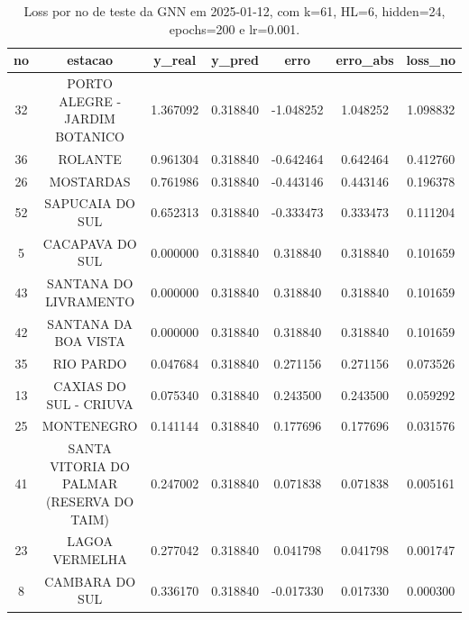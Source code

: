 \begin{table}[h]
\centering
\caption{Loss por no de teste da GNN em 2025-01-12, com k=61, HL=6, hidden=24, epochs=200 e lr=0.001.}
\label{tab:gnn_loss_k61_hl6_h24_e200_d20250112}
\begin{tabular}{ccccccc}
\toprule
no & estacao & y\_real & y\_pred & erro & erro\_abs & loss\_no \\
\midrule
32 & PORTO ALEGRE - JARDIM BOTANICO & 1.367092 & 0.318840 & -1.048252 & 1.048252 & 1.098832 \\
36 & ROLANTE & 0.961304 & 0.318840 & -0.642464 & 0.642464 & 0.412760 \\
26 & MOSTARDAS & 0.761986 & 0.318840 & -0.443146 & 0.443146 & 0.196378 \\
52 & SAPUCAIA DO SUL & 0.652313 & 0.318840 & -0.333473 & 0.333473 & 0.111204 \\
5 & CACAPAVA DO SUL & 0.000000 & 0.318840 & 0.318840 & 0.318840 & 0.101659 \\
43 & SANTANA DO LIVRAMENTO & 0.000000 & 0.318840 & 0.318840 & 0.318840 & 0.101659 \\
42 & SANTANA DA BOA VISTA & 0.000000 & 0.318840 & 0.318840 & 0.318840 & 0.101659 \\
35 & RIO PARDO & 0.047684 & 0.318840 & 0.271156 & 0.271156 & 0.073526 \\
13 & CAXIAS DO SUL - CRIUVA & 0.075340 & 0.318840 & 0.243500 & 0.243500 & 0.059292 \\
25 & MONTENEGRO & 0.141144 & 0.318840 & 0.177696 & 0.177696 & 0.031576 \\
41 & SANTA VITORIA DO PALMAR (RESERVA DO TAIM) & 0.247002 & 0.318840 & 0.071838 & 0.071838 & 0.005161 \\
23 & LAGOA VERMELHA & 0.277042 & 0.318840 & 0.041798 & 0.041798 & 0.001747 \\
8 & CAMBARA DO SUL & 0.336170 & 0.318840 & -0.017330 & 0.017330 & 0.000300 \\
\bottomrule
\end{tabular}
\end{table}
